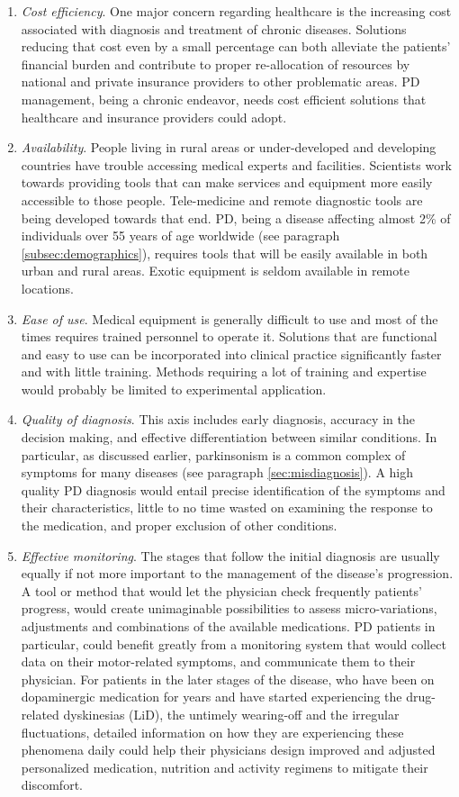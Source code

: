 \begin{enumerate}
\item \textit{Cost efficiency}. One major concern regarding healthcare is the increasing cost associated with diagnosis and treatment of chronic diseases. Solutions reducing that cost even by a small percentage can both alleviate the patients' financial burden and contribute to proper re-allocation of resources by national and private insurance providers to other problematic areas. \gls{PD} management, being a chronic endeavor, needs cost efficient solutions that healthcare and insurance providers could adopt.
\item \textit{Availability}. People living in rural areas or under-developed and developing countries have trouble accessing medical experts and facilities. Scientists work towards providing tools that can make services and equipment more easily accessible to those people. Tele-medicine and remote diagnostic tools are being developed towards that end. \gls{PD}, being a disease affecting almost 2\% of individuals over 55 years of age worldwide (see paragraph \ref{subsec:demographics}), requires tools that will be easily available in both urban and rural areas. Exotic equipment is seldom available in remote locations.
\item \textit{Ease of use}. Medical equipment is generally difficult to use and most of the times requires trained personnel to operate it. Solutions that are functional and easy to use can be incorporated into clinical practice significantly faster and with little training. Methods requiring a lot of training and expertise would probably be limited to experimental application. 
\item \textit{Quality of diagnosis}. This axis includes early diagnosis, accuracy in the decision making, and effective differentiation between similar conditions. In particular, as discussed earlier, parkinsonism is a common complex of symptoms for many diseases (see paragraph \ref{sec:misdiagnosis}). A high quality \gls{PD} diagnosis would entail precise identification of the symptoms and their characteristics, little to no time wasted on examining the response to the medication, and proper exclusion of other conditions. 
\item \textit{Effective monitoring}. The stages that follow the initial diagnosis are usually equally if not more important to the management of the disease's progression. A tool or method that would let the physician check frequently patients' progress, would create unimaginable possibilities to assess micro-variations, adjustments and combinations of the available medications. \gls{PD} patients in particular, could benefit greatly from a monitoring system that would collect data on their motor-related symptoms, and communicate them to their physician. For patients in the later stages of the disease, who have been on dopaminergic medication for years and have started experiencing the drug-related dyskinesias (\gls{LiD}), the untimely wearing-off and the irregular fluctuations, detailed information on how they are experiencing these phenomena daily could help their physicians design improved and adjusted personalized medication, nutrition and activity regimens to mitigate their discomfort. 

\end{enumerate}
